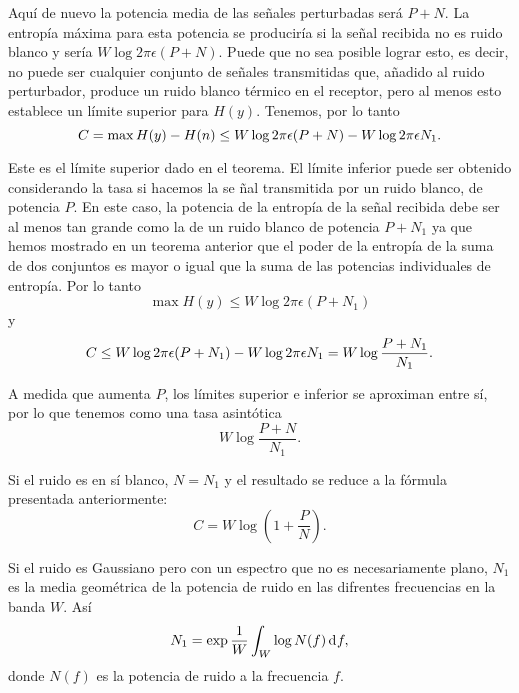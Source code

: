 Aqu\'i de nuevo la potencia media de las se\~nales perturbadas ser\'a
$P+N$. La entrop\'ia m\'axima para esta potencia se producir\'ia si la
se\~nal recibida no es ruido blanco y ser\'ia $W\log 2\pi \epsilon
(P+N)$.  Puede que no sea posible lograr esto, es decir, no puede ser
cualquier conjunto de se\~nales transmitidas que, a\~nadido al ruido
perturbador, produce un ruido blanco t\'ermico en el receptor, pero al
menos esto establece un l\'imite superior para $H(y)$.  Tenemos, por
lo tanto
\begin{equation}
C = \max H(y) - H(n)\bigskip
\leq W\log 2\pi\epsilon (P+N) - W\log 2\pi \epsilon N_{1}.
\end{equation}
	
Este es el l\'imite superior dado en el teorema. El l\'imite inferior
puede ser obtenido considerando la tasa si hacemos la se \~nal
transmitida por un ruido blanco, de potencia $P$. En este caso, la
potencia de la entrop\'ia de la se\~nal recibida debe ser al menos tan
grande como la de un ruido blanco de potencia $P + N_{1}$ ya que hemos
mostrado en un teorema anterior que el poder de la entrop\'ia de la
suma de dos conjuntos es mayor o igual que la suma de las potencias
individuales de entrop\'ia. Por lo tanto
\begin{equation}
\max H(y) \leq W\log 2\pi \epsilon(P+N_{1})
\end{equation}
y
\begin{equation}
C \leq W\log 2\pi \epsilon (P + N_{1}) - W\log 2 \pi \epsilon N_{1} \bigskip
= W\log \frac{P+N_{1}}{N_{1}}.
\end{equation}
	
A medida que aumenta $P$, los l\'imites superior e inferior se aproximan
entre s\'i, por lo que tenemos como una tasa asint\'otica
\begin{equation}
W\log \frac{P+N}{N_{1}}.
\end{equation}
	
Si el ruido es en s\'i blanco, $N = N_{1}$ y el resultado se reduce a
la f\'ormula presentada anteriormente:
\begin{equation}
C = W\log (1 + \frac{P}{N}).
\end{equation}
	
Si el ruido es Gaussiano pero con un espectro que no es necesariamente
plano, $N_{1}$ es la media geom\'etrica de la potencia de
ruido en las difrentes frecuencias en la banda $W$. As\'i
\begin{equation}
N_{1} = \exp \frac{1}{W} \int_W \log N(f) \diff f,
\end{equation}
donde $N(f)$ es la potencia de ruido a la frecuencia $f$.

